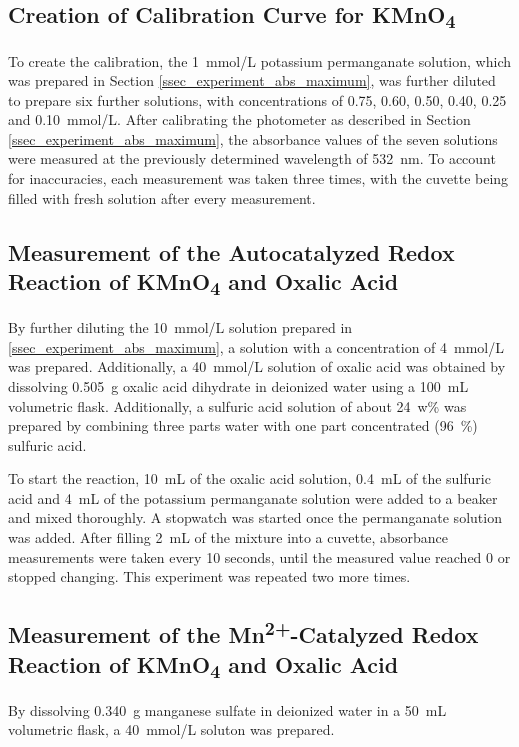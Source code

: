 \documentclass[titlepage]{article}
\begin{document}
\subsection{Creation of Calibration Curve for KMnO\texorpdfstring{\textsubscript{4}}{4}}
To create the calibration, the 1~mmol/L potassium permanganate solution, which was prepared in Section \ref{ssec_experiment_abs_maximum}, was further diluted to prepare six further solutions, with concentrations of 0.75, 0.60, 0.50, 0.40, 0.25 and 0.10~mmol/L. After calibrating the photometer as described in Section \ref{ssec_experiment_abs_maximum}, the absorbance values of the seven solutions were measured at the previously determined wavelength of 532~nm. To account for inaccuracies, each measurement was taken three times, with the cuvette being filled with fresh solution after every measurement.

\subsection{Measurement of the Autocatalyzed Redox Reaction of KMnO\texorpdfstring{\textsubscript{4}}{4} and Oxalic Acid} \label{ssec_experiment_reaction_autocatalyzed}
By further diluting the 10~mmol/L solution prepared in \ref{ssec_experiment_abs_maximum}, a solution with a concentration of 4~mmol/L was prepared. Additionally, a 40~mmol/L solution of oxalic acid was obtained by dissolving 0.505~g oxalic acid dihydrate in deionized water using a 100~mL volumetric flask. Additionally, a sulfuric acid solution of about 24~w\% was prepared by combining three parts water with one part concentrated (96~\%) sulfuric acid.

To start the reaction, 10~mL of the oxalic acid solution, 0.4~mL of the sulfuric acid and 4~mL of the potassium permanganate solution were added to a beaker and mixed thoroughly. A stopwatch was started once the permanganate solution was added. After filling 2~mL of the mixture into a cuvette, absorbance measurements were taken every 10 seconds, until the measured value reached 0 or stopped changing. This experiment was repeated two more times.

\subsection{Measurement of the Mn\texorpdfstring{\textsuperscript{2+}}{2+}-Catalyzed Redox Reaction of KMnO\texorpdfstring{\textsubscript{4}}{4} and Oxalic Acid}
By dissolving 0.340~g manganese sulfate in deionized water in a 50~mL volumetric flask, a 40~mmol/L soluton was prepared.
\end{document}
